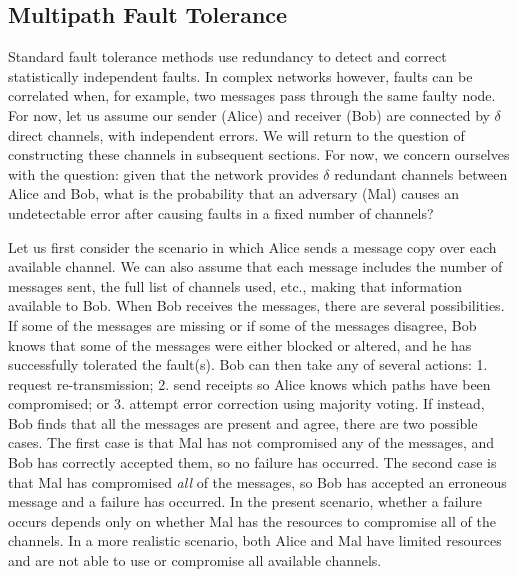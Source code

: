 \documentclass[10pt,letterpaper]{article}
\begin{document}
\subsection*{Multipath Fault Tolerance}

Standard fault tolerance methods use redundancy to detect and correct
statistically independent faults.
In complex networks however, faults can be correlated when,
for example, two messages pass through the same faulty node.
For now, let us assume our sender (Alice) and receiver (Bob) are connected
by $\delta$ direct channels, with independent errors.
We will return to the question of constructing these channels in subsequent
sections.
For now, we concern ourselves with the question:
given that the network provides $\delta$ redundant channels between
Alice and Bob,
what is the probability that an adversary (Mal) causes an undetectable
error after causing faults in a fixed number of channels?

Let us first consider the scenario in which
Alice sends a message copy over each available channel.
We can also assume that each message includes the number of messages sent,
the full list of channels used, etc.,
making that information available to Bob.
When Bob receives the messages, there are several possibilities.
If some of the messages are missing
or if some of the messages disagree,
Bob knows that some of the messages were either blocked or altered,
and he has successfully tolerated the fault(s).
Bob can then take any of several actions:
1. request re-transmission;
2. send receipts so Alice knows which paths have been compromised;
or 3. attempt error correction using majority voting.
If instead, Bob finds that all the messages are present and agree,
there are two possible cases.
The first case is that Mal has not compromised any of the messages,
and Bob has correctly accepted them, so no failure has occurred.
The second case is that Mal has compromised {\em all} of the messages,
so Bob has accepted an erroneous message and a failure has occurred.
In the present scenario,
whether a failure occurs depends only on whether Mal has the resources to
compromise all of the channels.
In a more realistic scenario,
both Alice and Mal have limited resources and are not able to use or
compromise all available channels.
\end{document}

